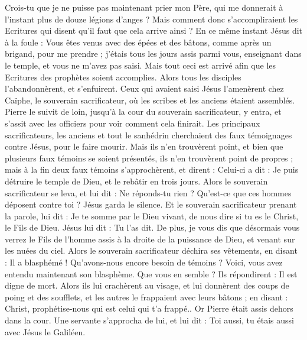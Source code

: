 \begin{multicols}{2}
Crois-tu que je ne puisse pas maintenant prier mon Père, qui me donnerait à l'instant plus de douze légions d'anges ?
Mais comment donc s'accompliraient les Ecritures qui disent qu'il faut que cela arrive ainsi ?
En ce même instant Jésus dit à la foule : Vous êtes venus avec des épées et des bâtons, comme après un brigand, pour me prendre ; j'étais tous les jours assis parmi vous, enseignant dans le temple, et vous ne m'avez pas saisi.
Mais tout ceci est arrivé afin que les Ecritures des prophètes soient accomplies. Alors tous les disciples l'abandonnèrent, et s'enfuirent.
Ceux qui avaient saisi Jésus l'amenèrent chez Caïphe, le souverain sacrificateur, où les scribes et les anciens étaient assemblés.
Pierre le suivit de loin, jusqu'à la cour du souverain sacrificateur, y entra, et s'assit avec les officiers pour voir comment cela finirait.
Les principaux sacrificateurs, les anciens et tout le sanhédrin cherchaient des faux témoignages contre Jésus, pour le faire mourir.
Mais ils n'en trouvèrent point, et bien que plusieurs faux témoins se soient présentés, ils n'en trouvèrent point de propres ; mais à la fin deux faux témoins s'approchèrent,
et dirent : Celui-ci a dit : Je puis détruire le temple de Dieu, et le rebâtir en trois jours.
Alors le souverain sacrificateur se leva, et lui dit : Ne réponds-tu rien ? Qu'est-ce que ces hommes déposent contre toi ?
Jésus garda le silence. Et le souverain sacrificateur prenant la parole, lui dit : Je te somme par le Dieu vivant, de nous dire si tu es le Christ, le Fils de Dieu.
Jésus lui dit : Tu l'as dit. De plus, je vous dis que désormais vous verrez le Fils de l'homme assis à la droite de la puissance de Dieu, et venant sur les nuées du ciel.
Alors le souverain sacrificateur déchira ses vêtements, en disant : Il a blasphémé ! Qu'avons-nous encore besoin de témoins ? Voici, vous avez entendu maintenant son blasphème. Que vous en semble ?
Ils répondirent : Il est digne de mort.
Alors ils lui crachèrent au visage, et lui donnèrent des coups de poing et des soufflets, et les autres le frappaient avec leurs bâtons ;
en disant : Christ, prophétise-nous qui est celui qui t'a frappé..
Or Pierre était assis dehors dans la cour. Une servante s'approcha de lui, et lui dit : Toi aussi, tu étais aussi avec Jésus le Galiléen.

\end{multicols}
